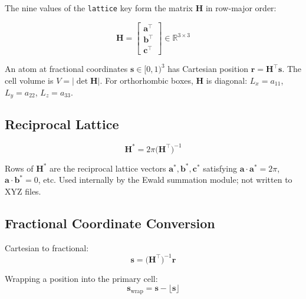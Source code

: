 \documentclass[11pt, a4paper, oneside]{article}
\newcommand{\avec}{\mathbf{a}}
\newcommand{\bvec}{\mathbf{b}}
\newcommand{\cvec}{\mathbf{c}}
\newcommand{\rvec}{\mathbf{r}}
\newcommand{\svec}{\mathbf{s}}
\begin{document}
The nine values of the \texttt{lattice} key form the matrix $\mathbf{H}$
in row-major order:

\begin{equation}
  \mathbf{H} =
  \begin{bmatrix}
    \avec^\top \\
    \bvec^\top \\
    \cvec^\top
  \end{bmatrix}
  \in \mathbb{R}^{3 \times 3}
  \label{eq:lattice}
\end{equation}

An atom at fractional coordinates $\svec \in [0,1)^3$ has Cartesian position
$\rvec = \mathbf{H}^\top \svec$. The cell volume is $V = |\det \mathbf{H}|$.
For orthorhombic boxes, $\mathbf{H}$ is diagonal:
$L_x = a_{11}$, $L_y = a_{22}$, $L_z = a_{33}$.

\subsection{Reciprocal Lattice}
\label{sec:pbc_recip}

\begin{equation}
  \mathbf{H}^* = 2\pi \bigl(\mathbf{H}^\top\bigr)^{-1}
  \label{eq:recip}
\end{equation}

Rows of $\mathbf{H}^*$ are the reciprocal lattice vectors $\mathbf{a}^*,
\mathbf{b}^*, \mathbf{c}^*$ satisfying $\avec \cdot \mathbf{a}^* = 2\pi$,
$\avec \cdot \mathbf{b}^* = 0$, etc. Used internally by the Ewald summation
module; not written to XYZ files.

\subsection{Fractional Coordinate Conversion}
\label{sec:pbc_frac}

Cartesian to fractional:
\begin{equation}
  \svec = \bigl(\mathbf{H}^\top\bigr)^{-1} \rvec
  \label{eq:cart2frac}
\end{equation}

Wrapping a position into the primary cell:
\begin{equation}
  \svec_{\mathrm{wrap}} = \svec - \lfloor \svec \rfloor
  \label{eq:wrap}
\end{equation}
\end{document}
